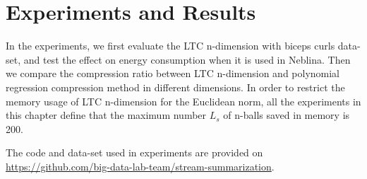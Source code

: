 \chapter{Experiments and Results}
\label{chap:expsAndResults}
In the experiments, we first evaluate the LTC n-dimension with biceps curls
data-set, and test the effect on energy consumption when it is used in Neblina.
Then we compare the compression ratio between LTC n-dimension and polynomial
regression compression method in different dimensions. In order to restrict the
memory usage of LTC n-dimension for the Euclidean norm, all the experiments in this
chapter define that the maximum number $L_s$ of n-balls saved in memory is 200.

The code and data-set used in experiments are provided on
\url{https://github.com/big-data-lab-team/stream-summarization}. 





